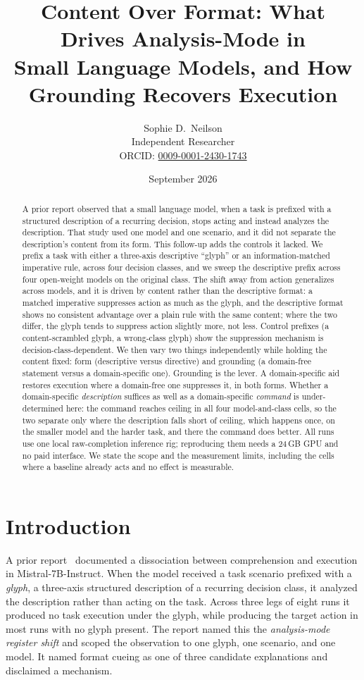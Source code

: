 \documentclass[11pt,a4paper]{article}
\title{%
  Content Over Format: What Drives Analysis-Mode in \\
  Small Language Models, and How Grounding Recovers Execution%
}
\author{Sophie D.\ Neilson \\
  \small Independent Researcher \\
  \small ORCID: \href{https://orcid.org/0009-0001-2430-1743}{0009-0001-2430-1743}
}
\date{September 2026}
\begin{document}
\maketitle

\begin{abstract}
A prior report observed that a small language model, when a task is prefixed with a
structured description of a recurring decision, stops acting and instead analyzes
the description. That study used one model and one scenario, and it did not separate
the description's content from its form. This follow-up adds the controls it lacked.
We prefix a task with either a three-axis descriptive ``glyph'' or an
information-matched imperative rule, across four decision classes, and we sweep the
descriptive prefix across four open-weight models on the original class. The shift
away from action generalizes across models, and it is driven by content rather than the
descriptive format: a matched imperative suppresses action as much as the glyph, and the
descriptive format shows no consistent advantage over a plain rule with the same content;
where the two differ, the glyph tends to suppress action slightly more, not less. Control prefixes (a content-scrambled glyph, a wrong-class glyph) show the
suppression mechanism is decision-class-dependent. We then vary two things
independently while holding the content fixed: form (descriptive versus directive)
and grounding (a domain-free statement versus a domain-specific one). Grounding is
the lever. A domain-specific aid restores execution where a domain-free one
suppresses it, in both forms. Whether a domain-specific \emph{description} suffices
as well as a domain-specific \emph{command} is under-determined here: the command
reaches ceiling in all four model-and-class cells, so the two separate only where
the description falls short of ceiling, which happens once, on the smaller model and
the harder task, and there the command does better. All runs use one local
raw-completion inference rig; reproducing them needs a 24\,GB GPU and no paid
interface. We state the scope and the measurement limits, including the cells where
a baseline already acts and no effect is measurable.
\end{abstract}

\section{Introduction}

A prior report~\citep{neilson2026register} documented a dissociation between
comprehension and execution in Mistral-7B-Instruct. When the model received a task
scenario prefixed with a \emph{glyph}, a three-axis structured description of a
recurring decision class, it analyzed the description rather than acting on the
task. Across three legs of eight runs it produced no task execution under the glyph,
while producing the target action in most runs with no glyph present. The report
named this the \emph{analysis-mode register shift} and scoped the observation to one
glyph, one scenario, and one model. It named format cueing as one of three candidate
explanations and disclaimed a mechanism.
\end{document}
